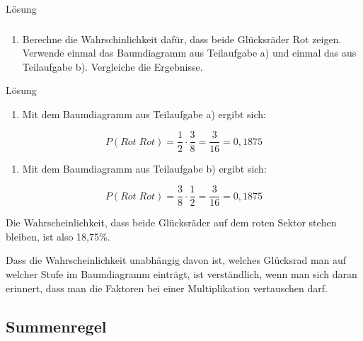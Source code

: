 \documentclass[
  ngerman,
]{book}
\providecommand{\tightlist}{%
  \setlength{\itemsep}{0pt}\setlength{\parskip}{0pt}}
\begin{document}
Lösung

\hypertarget{section-122}{%
\subsubsection*{}\label{section-122}}

\begin{enumerate}
\def\labelenumi{\alph{enumi})}
\setcounter{enumi}{2}
\tightlist
\item
  Berechne die Wahrschinlichkeit dafür, dass beide Glücksräder Rot zeigen. Verwende einmal das Baumdiagramm aus Teilaufgabe a) und einmal das aus Teilaufgabe b). Vergleiche die Ergebnisse.
\end{enumerate}

Lösung

\begin{enumerate}
\def\labelenumi{\arabic{enumi}.}
\tightlist
\item
  Mit dem Baumdiagramm aus Teilaufgabe a) ergibt sich:
\end{enumerate}

\[P(Rot\;Rot)=\frac{1}{2}\cdot\frac{3}{8}=\frac{3}{16}=0,1875\]

\begin{enumerate}
\def\labelenumi{\arabic{enumi}.}
\setcounter{enumi}{1}
\tightlist
\item
  Mit dem Baumdiagramm aus Teilaufgabe b) ergibt sich:
\end{enumerate}

\[P(Rot\;Rot)=\frac{3}{8}\cdot\frac{1}{2}=\frac{3}{16}=0,1875\]

Die Wahrscheinlichkeit, dass beide Glücksräder auf dem roten Sektor stehen bleiben, ist also 18,75\%.

Dass die Wahrscheinlichkeit unabhängig davon ist, welches Glücksrad man auf welcher Stufe im Baumdiagramm einträgt, ist verständlich, wenn man sich daran erinnert, dass man die Faktoren bei einer Multiplikation vertauschen darf.

\hypertarget{section-123}{%
\subsubsection*{}\label{section-123}}

\hypertarget{summenregel}{%
\subsection{Summenregel}\label{summenregel}}
\end{document}
